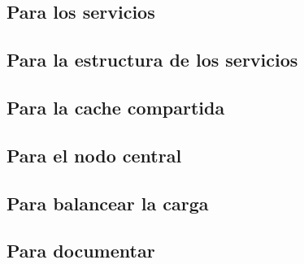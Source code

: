 \subsection{Para los servicios}
\label{soa:tecnologias:para-servicios}






\subsection{Para la estructura de los servicios}
\label{soa:tecnologias:para-estructura}






\subsection{Para la cache compartida}
\label{soa:tecnologias:para-cache-compartida}





\subsection{Para el nodo central}
\label{soa:tecnologias:para-nodo-central}








\subsection{Para balancear la carga}
\label{soa:tecnologias:para-balancear}





\subsection{Para documentar}
\label{soa:tecnologias:para-documentar}






